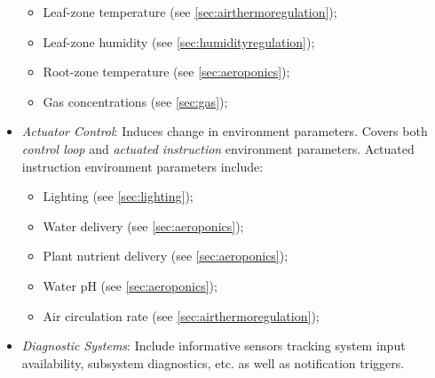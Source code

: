 \begin{itemize}
    \begin{itemize}
        \item Leaf-zone temperature (see \ref{sec:airthermoregulation});
        \item Leaf-zone humidity (see \ref{sec:humidityregulation});
        \item Root-zone temperature (see \ref{sec:aeroponics});
        \item Gas concentrations (see \ref{sec:gas});
    \end{itemize}
    \item \textit{Actuator Control}: Induces change in environment parameters. Covers both \textit{control loop} and \textit{actuated instruction} environment parameters. Actuated instruction environment parameters include:
    \begin{itemize}
        \item Lighting (see \ref{sec:lighting});
        \item Water delivery (see \ref{sec:aeroponics});
        \item Plant nutrient delivery (see \ref{sec:aeroponics});
        \item Water pH (see \ref{sec:aeroponics});
        \item Air circulation rate (see \ref{sec:airthermoregulation});
    \end{itemize}
    \item \textit{Diagnostic Systems}: Include informative sensors tracking system input availability, subsystem diagnostics, etc. as well as notification triggers.
\end{itemize}